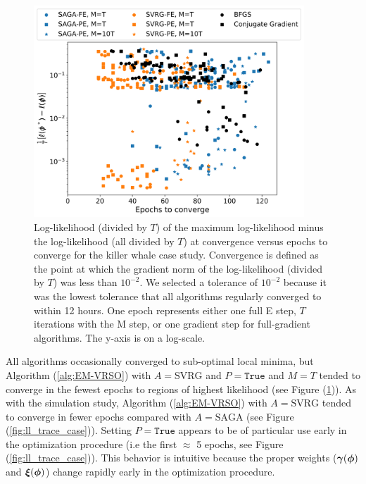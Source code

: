 \begin{figure}[h]
    \centering
    \includegraphics[width=4in]{../plt/scatterplot_case_study.png}
    \caption{Log-likelihood (divided by $T$) of the maximum log-likelihood minus the log-likelihood (all divided by $T$) at convergence versus epochs to converge for the killer whale case study. Convergence is defined as the point at which the gradient norm of the log-likelihood (divided by $T$) was less than $10^{-2}$. We selected a tolerance of $10^{-2}$ because it was the lowest tolerance that all algorithms regularly converged to within 12 hours. One epoch represents either one full E step, $T$ iterations with the M step, or one gradient step for full-gradient algorithms. The y-axis is on a log-scale.}
    \label{fig:scatterplot_case}
\end{figure}
%
All algorithms occasionally converged to sub-optimal local minima, but Algorithm (\ref{alg:EM-VRSO}) with $A = \text{SVRG}$ and $P=\texttt{True}$ and $M=T$ tended to converge in the fewest epochs to regions of highest likelihood (see Figure (\ref{fig:scatterplot_case})). As with the simulation study, Algorithm (\ref{alg:EM-VRSO}) with $A = \text{SVRG}$ tended to converge in fewer epochs compared with $A=\text{SAGA}$ (see Figure (\ref{fig:ll_trace_case})). Setting $P = \texttt{True}$ appears to be of particular use early in the optimization procedure (i.e the first $\approx$ 5 epochs, see Figure (\ref{fig:ll_trace_case})). This behavior is intuitive because the proper weights ($\boldsymbol{\gamma}(\boldsymbol{\phi})$ and $\boldsymbol{\xi}(\boldsymbol{\phi})$) change rapidly early in the optimization procedure. 


